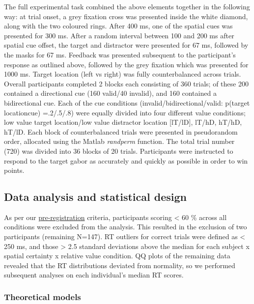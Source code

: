 \documentclass[11pt,halfline,a4paper,]{ouparticle}
\begin{document}
The full experimental task combined the above elements together in the following way: at trial onset, a grey fixation cross was presented inside the white diamond, along with the two coloured rings. After 400 ms, one of the spatial cues was presented for 300 ms. After a random interval between 100 and 200 ms after spatial cue offset, the target and distractor were presented for 67 ms, followed by the masks for 67 ms. Feedback was presented subsequent to the participant's response as outlined above, followed by the grey fixation which was presented for 1000 ms. Target location (left vs right) was fully counterbalanced across trials. Overall participants completed 2 blocks each consisting of 360 trials; of these 200 contained a directional cue (160 valid/40 invalid), and 160 contained a bidirectional cue. Each of the cue conditions (invalid/bidirectional/valid: p(target location\textbar cue) =.2/.5/.8) were equally divided into four different value conditions; low value target location/low value distractor location {[}lT/lD{]}, lT/hD, hT/hD, hT/lD. Each block of counterbalanced trials were presented in pseudorandom order, allocated using the Matlab \emph{randperm} function. The total trial number (720) was divided into 36 blocks of 20 trials. Participants were instructed to respond to the target gabor as accurately and quickly as possible in order to win points.

\hypertarget{data-analysis-and-statistical-design}{%
\subsection{Data analysis and statistical design}\label{data-analysis-and-statistical-design}}

\label{sec:Statdesign}

As per our \href{https://osf.io/erz4u/?view_only=68eaee13f7af49e2b2bae30d57570e5f}{pre-registration} criteria, participants scoring \textless{} 60 \% across all conditions were excluded from the analysis. This resulted in the exclusion of two participants (remaining N=147). RT outliers for correct trials were defined as \textless{} 250 ms, and those \textgreater{} 2.5 standard deviations above the median for each subject x spatial certainty x relative value condition. QQ plots of the remaining data revealed that the RT distributions deviated from normality, so we performed subsequent analyses on each individual's median RT scores.

\hypertarget{theoretical-models}{%
\subsubsection{Theoretical models}\label{theoretical-models}}
\end{document}

